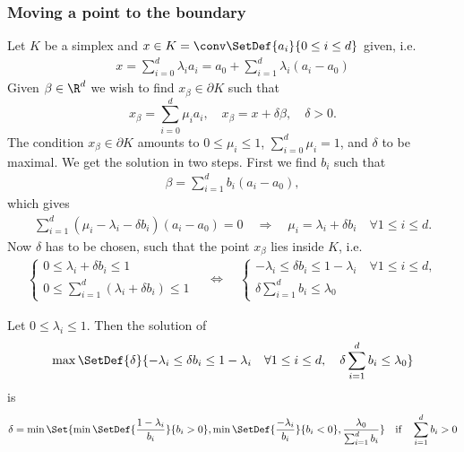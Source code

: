 \subsubsection{Moving a point to the boundary}
%
Let $K$ be a simplex and $x\in K=\conv\SetDef{a_i}{0\le i\le d}$ given, i.e.
%
\begin{align*}
x = \sum_{i=0}^d \lambda_i a_i = a_0 + \sum_{i=1}^d \lambda_i (a_i-a_0)
\end{align*}
%
Given $\beta\in\R^d$ we wish to find $x_{\beta}\in\partial K$ such that
%
\begin{equation}\label{eq:fem_upw_target}
x_{\beta} = \sum_{i=0}^d \mu_i a_i,\quad x_{\beta} = x + \delta \beta,\quad \delta>0.
\end{equation}
%
The condition $x_{\beta}\in\partial K$ amounts to $0\le \mu_i\le 1$, $\sum_{i=0}^d\mu_i=1$, and $\delta$ to be maximal.
We get the solution in two steps. First we find $b_i$ such that
%
\begin{align*}
\beta = \sum_{i=1}^d b_i (a_i-a_0),
\end{align*}
%
which gives
%
\begin{align*}
\sum_{i=1}^d (\mu_i - \lambda_i - \delta b_i) (a_i-a_0)=0\quad\Rightarrow\quad \mu_i = \lambda_i + \delta b_i\quad \forall 1\le i\le d.
\end{align*}
%
Now $\delta$ has to be chosen, such that the point $x_{\beta}$ lies inside $K$, i.e.
%
\begin{align*}
%
\left\{
\begin{aligned}
0 \le \lambda_i + \delta b_i \le 1\\
0 \le \sum_{i=1}^d (\lambda_i + \delta b_i)  \le 1
\end{aligned}
\right.
%
 \quad\Leftrightarrow\quad 
\left\{
\begin{aligned}
-\lambda_i \le  \delta b_i \le 1-\lambda_i\quad \forall 1\le i\le d,\\
\delta \sum_{i=1}^db_i \le \lambda_0
\end{aligned}
\right.
\end{align*}
%
\begin{lemma}\label{lemma:}
Let $0 \le \lambda_i \le 1$. Then the solution of
%
\begin{equation}\label{eq:}
\max\SetDef{\delta}{-\lambda_i \le \delta b_i \le 1-\lambda_i\quad\forall 1\le i\le d,\quad \delta \sum_{i=1}^db_i \le \lambda_0}
\end{equation}
%
is
%
\begin{equation}\label{eq:fem_upw_sol_delta}
\delta = \min \Set{ \min\SetDef{\frac{1-\lambda_i}{b_i}}{b_i>0},  \min\SetDef{\frac{-\lambda_i}{b_i}}{b_i<0},
\frac{\lambda_0}{\sum_{i=1}^db_i}}\quad \mbox{if} \quad \sum_{i=1}^db_i>0
\end{equation}
%
\end{lemma}
